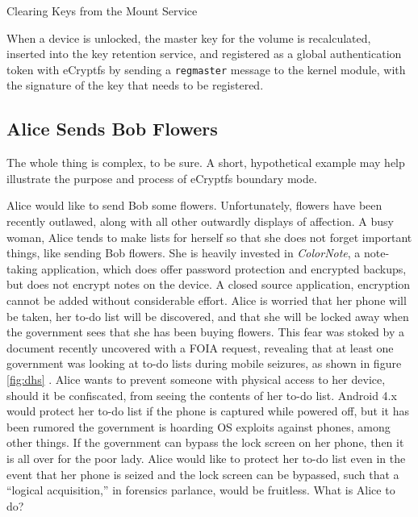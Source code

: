 \begin{table}

\caption{Clearing Keys from the Mount Service}
\label{tab:mountservice}
\end{table}

When a device is unlocked, the master key for the volume is recalculated, inserted into the key retention service, and registered
as a global authentication token with eCryptfs by sending a \texttt{regmaster} message to the kernel module, with the signature of
the key that needs to be registered. 

\subsection{Alice Sends Bob Flowers}
\label{sec:alicebob}
The whole thing is complex, to be sure. A short, hypothetical example may help illustrate the purpose and process of eCryptfs boundary mode.  

Alice would like to send Bob some flowers. Unfortunately, flowers have been recently outlawed, along with all other outwardly
displays of affection. A busy woman, Alice tends to make lists for herself so that she does not forget important things, like
sending Bob flowers. She is heavily invested in \emph{ColorNote}, a note-taking application, which does offer password protection
and encrypted backups, but does not encrypt notes on the device. A closed source application, encryption cannot be added without
considerable effort. Alice is worried that her phone will be taken, her to-do list will be discovered, and that she will be locked
away when the government sees that she has been buying flowers. This fear was stoked by a document recently uncovered with a FOIA
request, revealing that at least one government was looking at to-do lists during mobile seizures, as shown in figure \ref{fig:dhs}
\cite{dhsfoia}. Alice wants to prevent someone with physical access to her device, should it be confiscated, from seeing
the contents of her to-do list. Android 4.x would protect her to-do list if the phone is captured while powered off, but it has
been rumored the government is hoarding OS exploits against phones, among other things. If the government can bypass the lock screen
on her phone, then it is all over for the poor lady. Alice would like to protect her to-do list even in the event that her phone is
seized and the lock screen can be bypassed, such that a ``logical acquisition,'' in forensics parlance, would be fruitless. What is
Alice to do?

